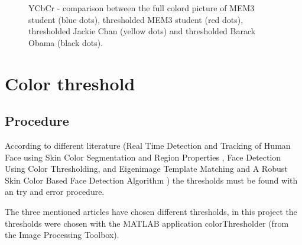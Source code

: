 \documentclass[Bachelorarbeit.tex]{subfiles}
\begin{document}
\begin{figure}[!h]
\centering
{}
\caption[YCbCr - comparison - MEM3 student, Chan and Obama]{YCbCr - comparison between the full colord picture of MEM3 student (blue dots), thresholded MEM3 student (red dots), thresholded Jackie Chan (yellow dots) and thresholded Barack Obama (black dots).}
\label{testPicturesComparison}
\end{figure}

\newpage

\section{Color threshold}\label{sec:ColorThre}  	
\subsection{Procedure}
According to different literature (Real Time Detection and Tracking of Human Face using Skin Color Segmentation and Region Properties \cite{RTFaceDetection}, Face Detection Using Color Thresholding, and Eigenimage Template Matching \cite{RTFaceDetection} and A Robust Skin Color Based Face Detection Algorithm \cite{RobustSkinColorFD}) the thresholds must be found with an try and error procedure.

The three mentioned articles have chosen different thresholds, in this project the thresholds were chosen with the MATLAB application colorThresholder (from the Image Processing Toolbox).
\end{document}

